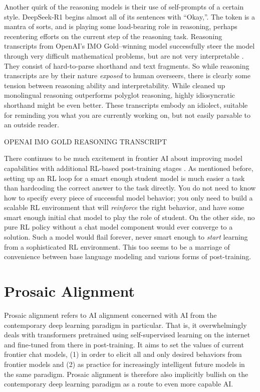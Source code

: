 Another quirk of the reasoning models is their use of self-prompts of a certain
style. DeepSeek-R1 begins almost all of its sentences with ``Okay,''. The token
is a mantra of sorts, and is playing some load-bearing role in reasoning,
perhaps recentering efforts on the current step of the reasoning task.
Reasoning transcripts from OpenAI's IMO Gold--winning model successfully steer
the model through very difficult mathematical problems, but are not very
interpretable \cite{}. They consist of hard-to-parse shorthand and text
fragments. So while reasoning transcripts are by their nature \emph{exposed} to
human overseers, there is clearly some tension between reasoning ability and
interpretability. While cleaned up monolingual reasoning outperforms polyglot
reasoning, highly idiosyncratic shorthand might be even better. These
transcripts embody an idiolect, suitable for reminding you what you are
currently working on, but not easily parsable to an outside reader.

OPENAI IMO GOLD REASONING TRANSCRIPT

There continues to be much excitement in frontier AI about improving model
capabilities with additional RL-based post-training stages
\cite{silver2025experience}. As mentioned before, setting up an RL loop for a
smart enough student model is much easier a task than hardcoding the correct
answer to the task directly. You do not need to know how to specify every piece
of successful model behavior; you only need to build a scalable RL environment
that will \emph{reinforce} the right behavior, and have some smart enough
initial chat model to play the role of student. On the other side, no pure RL
policy without a chat model component would ever converge to a solution. Such a
model would flail forever, never smart enough to \emph{start} learning from a
sophisticated RL environment. This too seems to be a marriage of convenience
between base language modeling and various forms of post-training.

\section{Prosaic Alignment}
Prosaic alignment refers to AI alignment concerned with AI from the
contemporary deep learning paradigm in particular. That is, it overwhelmingly
deals with transformers pretrained using self-supervised learning on the
internet and fine-tuned from there in post-training. It aims to set the values
of current frontier chat models, (1) in order to elicit all and only desired
behaviors from frontier models and (2) as practice for increasingly intelligent
future models in the same paradigm. Prosaic alignment is therefore also
implicitly bullish on the contemporary deep learning paradigm as a route to
even more capable AI.

